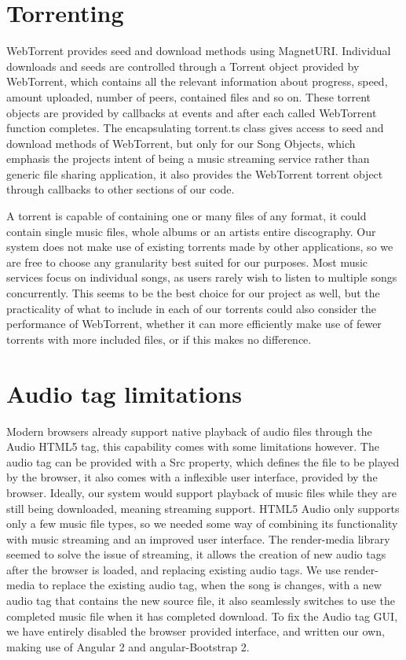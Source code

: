 \section{Torrenting}
WebTorrent provides seed and download methods using MagnetURI.
Individual downloads and seeds are controlled through a Torrent object provided by WebTorrent,
which contains all the relevant information about progress, 
speed, amount uploaded, number of peers, contained files and so on.
These torrent objects are provided by callbacks at events
and after each called WebTorrent function completes.
The encapsulating torrent.ts class gives access to seed and download methods of WebTorrent, 
but only for our Song Objects, which emphasis the projects intent of being a music streaming service 
rather than generic file sharing application, 
it also provides the WebTorrent torrent object through callbacks to other sections of our code.
\newline

A torrent is capable of containing one or many files of any format, 
it could contain single music files, whole albums or an artists entire discography.
Our system does not make use of existing torrents made by other applications,
so we are free to choose any granularity best suited for our purposes.
Most music services focus on individual songs, 
as users rarely wish to listen to multiple songs concurrently.
This seems to be the best choice for our project as well, 
but the practicality of what to include in each of our torrents 
could also consider the performance of WebTorrent,
whether it can more efficiently make use of fewer torrents with more included files, 
or if this makes no difference.
\newline

\section{Audio tag limitations}
Modern browsers already support native playback of audio files through the Audio \acs{HTML}5 tag, 
this capability comes with some limitations however.
The audio tag can be provided with a Src property, which defines the file to be played by the browser,
it also comes with a inflexible user interface, provided by the browser.
Ideally, our system would support playback of music files while they are still being downloaded, 
meaning streaming support. 
\acs{HTML}5 Audio only supports only a few music file types,
so we needed some way of combining its functionality with music streaming and an improved user interface.
The render-media library seemed to solve the issue of streaming, it allows the creation of new
audio tags after the browser is loaded, and replacing existing audio tags.
We use render-media to replace the existing audio tag, when the song is changes,
with a new audio tag that contains the new source file, it also seamlessly switches
to use the completed music file when it has completed download.
To fix the Audio tag \acs{GUI}, we have entirely disabled the browser provided interface,
and written our own, making use of Angular 2 and angular-Bootstrap 2.
\newline


